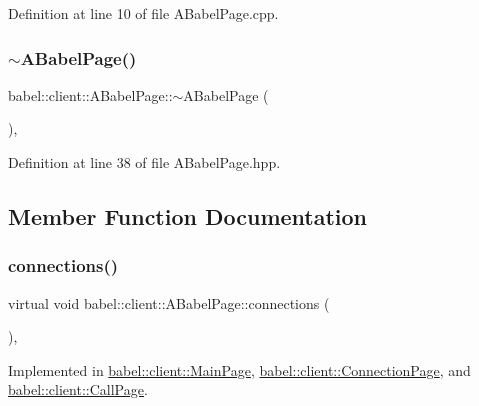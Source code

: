 Definition at line 10 of file A\+Babel\+Page.\+cpp.

\mbox{\label{classbabel_1_1client_1_1_a_babel_page_a8e7736f1bae579f73ac41bdc3e23f2a4}} 
\subsubsection{\texorpdfstring{$\sim$\+A\+Babel\+Page()}{~ABabelPage()}}
{\footnotesize\ttfamily babel\+::client\+::\+A\+Babel\+Page\+::$\sim$\+A\+Babel\+Page (\begin{DoxyParamCaption}{ }\end{DoxyParamCaption})\hspace{0.3cm}{\ttfamily [inline]}, {\ttfamily [override]}}



Definition at line 38 of file A\+Babel\+Page.\+hpp.



\subsection{Member Function Documentation}
\mbox{\label{classbabel_1_1client_1_1_a_babel_page_a37097dfd8ded982074554509e5eab8b0}} 
\subsubsection{\texorpdfstring{connections()}{connections()}}
{\footnotesize\ttfamily virtual void babel\+::client\+::\+A\+Babel\+Page\+::connections (\begin{DoxyParamCaption}{ }\end{DoxyParamCaption})\hspace{0.3cm}{\ttfamily [protected]}, {}}



Implemented in \mbox{\hyperlink{classbabel_1_1client_1_1_main_page_a4c7d94ab3421e1032ed97dc90787f57a}{babel\+::client\+::\+Main\+Page}}, \mbox{\hyperlink{classbabel_1_1client_1_1_connection_page_a26c103c38cfa6d25e1b6a30a76746284}{babel\+::client\+::\+Connection\+Page}}, and \mbox{\hyperlink{classbabel_1_1client_1_1_call_page_af870c94b659fbdeab276b59f61bf3008}{babel\+::client\+::\+Call\+Page}}.



